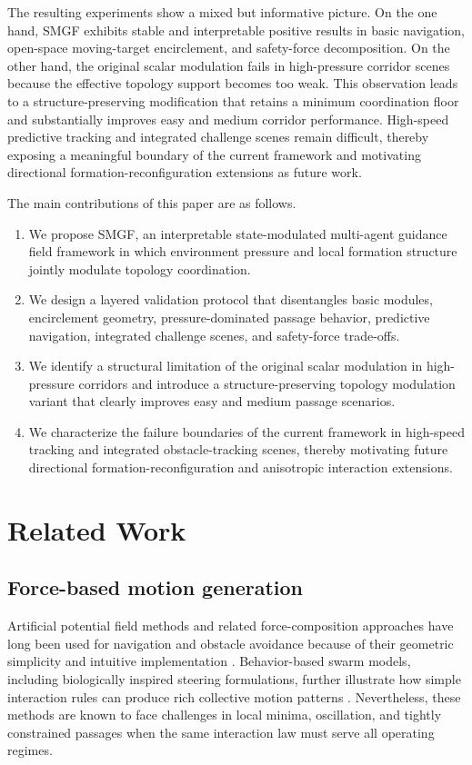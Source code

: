 \documentclass[utf8]{FrontiersinHarvard}
\begin{document}
The resulting experiments show a mixed but informative picture. On the one hand, SMGF exhibits stable and interpretable positive results in basic navigation, open-space moving-target encirclement, and safety-force decomposition. On the other hand, the original scalar modulation fails in high-pressure corridor scenes because the effective topology support becomes too weak. This observation leads to a structure-preserving modification that retains a minimum coordination floor and substantially improves easy and medium corridor performance. High-speed predictive tracking and integrated challenge scenes remain difficult, thereby exposing a meaningful boundary of the current framework and motivating directional formation-reconfiguration extensions as future work.

The main contributions of this paper are as follows.

\begin{enumerate}
    \item We propose SMGF, an interpretable state-modulated multi-agent guidance field framework in which environment pressure and local formation structure jointly modulate topology coordination.
    \item We design a layered validation protocol that disentangles basic modules, encirclement geometry, pressure-dominated passage behavior, predictive navigation, integrated challenge scenes, and safety-force trade-offs.
    \item We identify a structural limitation of the original scalar modulation in high-pressure corridors and introduce a structure-preserving topology modulation variant that clearly improves easy and medium passage scenarios.
    \item We characterize the failure boundaries of the current framework in high-speed tracking and integrated obstacle-tracking scenes, thereby motivating future directional formation-reconfiguration and anisotropic interaction extensions.
\end{enumerate}

\section{Related Work}

\subsection{Force-based motion generation}

Artificial potential field methods and related force-composition approaches have long been used for navigation and obstacle avoidance because of their geometric simplicity and intuitive implementation \citep{khatib1986}. Behavior-based swarm models, including biologically inspired steering formulations, further illustrate how simple interaction rules can produce rich collective motion patterns \citep{reynolds1987}. Nevertheless, these methods are known to face challenges in local minima, oscillation, and tightly constrained passages when the same interaction law must serve all operating regimes.
\end{document}
